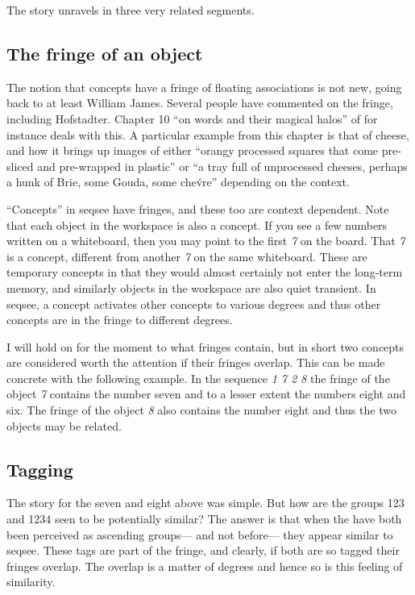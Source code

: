 \documentclass{article}
\begin{document}
The story unravels in three very related segments.

\subsection{The fringe of an object}

The notion that concepts have a fringe of floating associations is not new, going back to at least William James.  Several people have commented on the fringe, including Hofstadter.  Chapter 10 ``on words and their magical halos'' of \cite{Hofstadter:LeTon} for instance deals with this.  A particular example from this chapter is that of cheese, and how it brings up images of either ``orangy processed squares that come pre-sliced and pre-wrapped in plastic'' or ``a tray full of unprocessed cheeses, perhaps a hunk of Brie, some Gouda, some che\'vre'' depending on the context.

``Concepts'' in seqsee have fringes, and these too are context dependent.  Note that each object in the workspace is also a concept.  If you see a few numbers written on a whiteboard, then you may point to the first \emph{7} on the board.  That \emph{7} is a concept, different from another \emph{7} on the same whiteboard.  These are temporary concepts in that they would almost certainly not enter the long-term memory, and similarly objects in the workspace are also quiet transient.  In seqsee, a concept activates other concepts to various degrees and thus other concepts are in the fringe to different degrees.

I will hold on for the moment to what fringes contain, but in short two concepts are considered worth the attention if their fringes overlap.  This can be made concrete with the following example.  In the sequence \emph{1 7 2 8} the fringe of the object \emph{7} contains the number seven and to a lesser extent the numbers eight and six.  The fringe of the object \emph{8} also contains the number eight and thus the two objects may be related.

\subsection{Tagging}

The story for the seven and eight above was simple.  But how are the groups 123 and 1234 seen to be potentially similar?  The answer is that when the have both been perceived as ascending groups--- and not before--- they appear similar to seqsee.  These tags are part of the fringe, and clearly, if both are so tagged their fringes overlap.  The overlap is a matter of degrees and hence so is this feeling of similarity.
\end{document}
